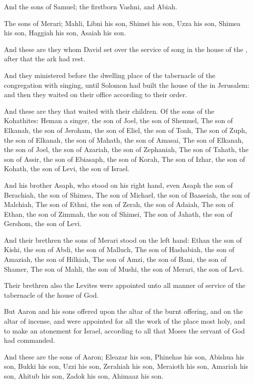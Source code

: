 \verse And the sons of Samuel; the firstborn Vashni, and Abiah.

\verse The sons of Merari; Mahli, Libni his son, Shimei his son, Uzza his son, \verse Shimea his son, Haggiah his son, Asaiah his son.

\verse And these are they whom David set over the service of song in the house of the \LORD, after that the ark had rest.

\verse And they ministered before the dwelling place of the tabernacle of the congregation with singing, until Solomon had built the house of the \LORD in Jerusalem: and then they waited on their office according to their order.

\verse And these are they that waited with their children. Of the sons of the Kohathites: Heman a singer, the son of Joel, the son of Shemuel, \verse The son of Elkanah, the son of Jeroham, the son of Eliel, the son of Toah, \verse The son of Zuph, the son of Elkanah, the son of Mahath, the son of Amasai, \verse The son of Elkanah, the son of Joel, the son of Azariah, the son of Zephaniah, \verse The son of Tahath, the son of Assir, the son of Ebiasaph, the son of Korah, \verse The son of Izhar, the son of Kohath, the son of Levi, the son of Israel.

\verse And his brother Asaph, who stood on his right hand, even Asaph the son of Berachiah, the son of Shimea, \verse The son of Michael, the son of Baaseiah, the son of Malchiah, \verse The son of Ethni, the son of Zerah, the son of Adaiah, \verse The son of Ethan, the son of Zimmah, the son of Shimei, \verse The son of Jahath, the son of Gershom, the son of Levi.

\verse And their brethren the sons of Merari stood on the left hand: Ethan the son of Kishi, the son of Abdi, the son of Malluch, \verse The son of Hashabiah, the son of Amaziah, the son of Hilkiah, \verse The son of Amzi, the son of Bani, the son of Shamer, \verse The son of Mahli, the son of Mushi, the son of Merari, the son of Levi.

\verse Their brethren also the Levites were appointed unto all manner of service of the tabernacle of the house of God.

\verse But Aaron and his sons offered upon the altar of the burnt offering, and on the altar of incense, and were appointed for all the work of the place most holy, and to make an atonement for Israel, according to all that Moses the servant of God had commanded.

\verse And these are the sons of Aaron; Eleazar his son, Phinehas his son, Abishua his son, \verse Bukki his son, Uzzi his son, Zerahiah his son, \verse Meraioth his son, Amariah his son, Ahitub his son, \verse Zadok his son, Ahimaaz his son.

